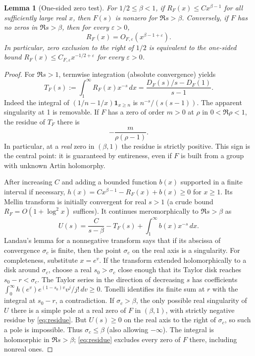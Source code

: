 \documentclass[11pt]{article}
\newtheorem{lemma}[theorem]{Lemma}
\theoremstyle{remark}\newtheorem{remark}[theorem]{Remark}
\newcommand{\one}{\mathbf{1}}
\begin{document}
\begin{lemma}[One-sided zero test]\label{lem:analytic}
For $1/2\le\beta<1$, if $R_F(x)\le C x^{\beta-1}$ for all sufficiently large real $x$, then $F(s)$ is nonzero for $\Re s>\beta$. Conversely, if $F$ has no zeros in $\Re s>\beta$, then for every $\varepsilon>0$,
\[ R_F(x)=O_{F,\varepsilon}(x^{\beta-1+\varepsilon}).\]
In particular, zero exclusion to the right of $1/2$ is equivalent to the one-sided bound $R_F(x)\le C_{F,\varepsilon}x^{-1/2+\varepsilon}$ for every $\varepsilon>0$.
\end{lemma}
\begin{proof}
For $\Re s>1$, termwise integration (absolute convergence) yields
\begin{equation}\label{eq:mellin}
 T_F(s):=\int_1^\infty R_F(x)x^{-s}\,dx
 =\frac{D_F(s)/s-D_F(1)}{s-1}.
\end{equation}
Indeed the integral of $(1/n-1/x)\one_{x\ge n}$ is $n^{-s}/(s(s-1))$. The apparent singularity at 1 is removable. If $F$ has a zero of order $m>0$ at $\rho$ in $0<\Re\rho<1$, the residue of $T_F$ there is
\begin{equation}\label{eq:residue}
 -\frac{m}{\rho(\rho-1)}.
\end{equation}
In particular, at a \emph{real} zero in $(\beta,1)$ the residue is strictly positive. This sign is the central point: it is guaranteed by entireness, even if $F$ is built from a group with unknown Artin holomorphy.

After increasing $C$ and adding a bounded function $b(x)$ supported in a finite interval if necessary, $h(x)=C x^{\beta-1}-R_F(x)+b(x)\ge0$ for $x\ge1$. Its Mellin transform is initially convergent for real $s>1$ (a crude bound $R_F=O(1+\log^2 x)$ suffices). It continues meromorphically to $\Re s>\beta$ as
\[ U(s)=\frac C{s-\beta}-T_F(s)+\int_1^\infty b(x)x^{-s}\,dx.\]
Landau's lemma for a nonnegative transform says that if its abscissa of convergence $\sigma_c$ is finite, then the point $\sigma_c$ on the real axis is a singularity. For completeness, substitute $x=e^v$. If the transform extended holomorphically to a disk around $\sigma_c$, choose a real $s_0>\sigma_c$ close enough that its Taylor disk reaches $s_0-r<\sigma_c$. The Taylor series in the direction of decreasing $s$ has coefficients $\int_0^\infty h(e^v)e^{(1-s_0)v}v^j/j!\,dv\ge0$. Tonelli identifies its finite sum at $r$ with the integral at $s_0-r$, a contradiction. If $\sigma_c>\beta$, the only possible real singularity of $U$ there is a simple pole at a real zero of $F$ in $(\beta,1)$, with strictly negative residue by \eqref{eq:residue}. But $U(s)\ge0$ on the real axis to the right of $\sigma_c$, so such a pole is impossible. Thus $\sigma_c\le\beta$ (also allowing $-\infty$). The integral is holomorphic in $\Re s>\beta$; \eqref{eq:residue} excludes every zero of $F$ there, including nonreal ones.


\end{proof}
\end{document}
